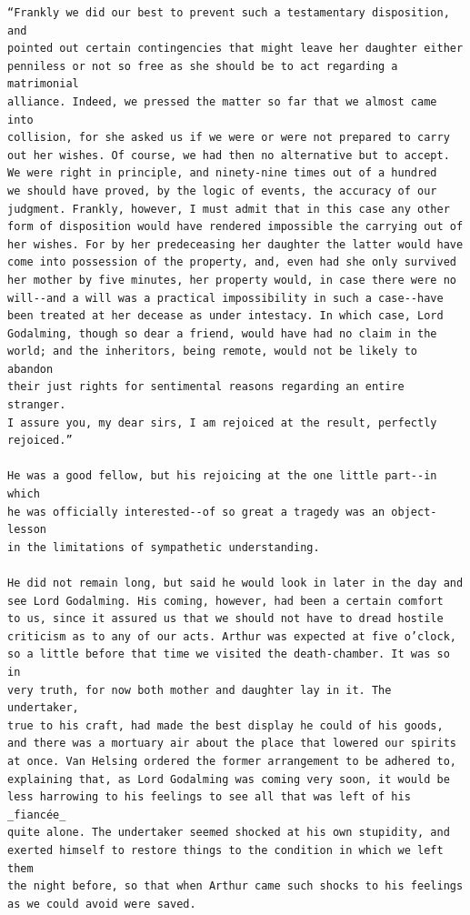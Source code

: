 \documentclass{article}
\begin{document}
\begin{verbatim}
“Frankly we did our best to prevent such a testamentary disposition, and
pointed out certain contingencies that might leave her daughter either
penniless or not so free as she should be to act regarding a matrimonial
alliance. Indeed, we pressed the matter so far that we almost came into
collision, for she asked us if we were or were not prepared to carry
out her wishes. Of course, we had then no alternative but to accept.
We were right in principle, and ninety-nine times out of a hundred
we should have proved, by the logic of events, the accuracy of our
judgment. Frankly, however, I must admit that in this case any other
form of disposition would have rendered impossible the carrying out of
her wishes. For by her predeceasing her daughter the latter would have
come into possession of the property, and, even had she only survived
her mother by five minutes, her property would, in case there were no
will--and a will was a practical impossibility in such a case--have
been treated at her decease as under intestacy. In which case, Lord
Godalming, though so dear a friend, would have had no claim in the
world; and the inheritors, being remote, would not be likely to abandon
their just rights for sentimental reasons regarding an entire stranger.
I assure you, my dear sirs, I am rejoiced at the result, perfectly
rejoiced.”

He was a good fellow, but his rejoicing at the one little part--in which
he was officially interested--of so great a tragedy was an object-lesson
in the limitations of sympathetic understanding.

He did not remain long, but said he would look in later in the day and
see Lord Godalming. His coming, however, had been a certain comfort
to us, since it assured us that we should not have to dread hostile
criticism as to any of our acts. Arthur was expected at five o’clock,
so a little before that time we visited the death-chamber. It was so in
very truth, for now both mother and daughter lay in it. The undertaker,
true to his craft, had made the best display he could of his goods,
and there was a mortuary air about the place that lowered our spirits
at once. Van Helsing ordered the former arrangement to be adhered to,
explaining that, as Lord Godalming was coming very soon, it would be
less harrowing to his feelings to see all that was left of his _fiancée_
quite alone. The undertaker seemed shocked at his own stupidity, and
exerted himself to restore things to the condition in which we left them
the night before, so that when Arthur came such shocks to his feelings
as we could avoid were saved.


\end{verbatim}
\end{document}
